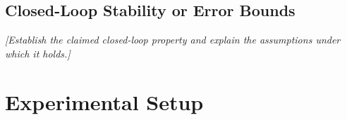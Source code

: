 \documentclass[10pt,journal]{IEEEtran}
\newcommand{\placeholder}[1]{\textit{[#1]}}
\newtheorem{theorem}{Theorem}
\begin{document}
\subsection{Closed-Loop Stability or Error Bounds}
\placeholder{Establish the claimed closed-loop property and explain
the assumptions under which it holds.}

%
\fi

\section{Experimental Setup}
\label{sec:setup}
\end{document}
